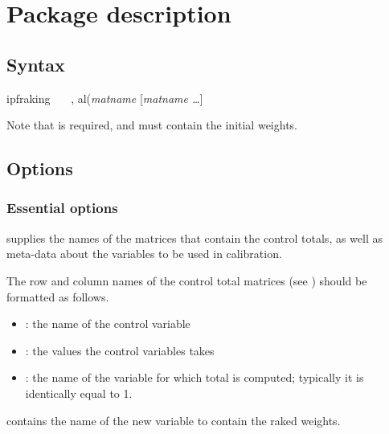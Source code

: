 \section{Package description}

\subsection{Syntax}

\begin{stsyntax}
ipfraking
\optif\
\optin\
\optweight\
,
al({\it matname} [{\it matname \ldots}]
\end{stsyntax}

\hangpara
Note that \stcmd{[pw=\varname]} is required, and must contain the initial weights.

\subsection{Options}

\subsubsection{Essential options}

\hangpara
{} \RB\stcmd{)}
supplies the names of the matrices that contain the control
totals, as well as meta-data about the variables to be used
in calibration.

\begin{sttech}
The row and column names of the control total matrices
(see ) should be formatted as follows.
\begin{itemize}
    \item \stcmd{rownames}: the name of the control variable
    \item \stcmd{colnames}: the values the control variables takes
    \item {}: the name of the variable for which total is computed;
          typically it is identically equal to 1.
\end{itemize}
\end{sttech}

\hangpara
{}
contains the name of the new variable to contain the raked weights.

